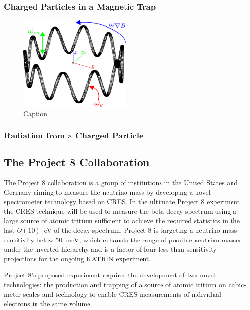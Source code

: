 \subsubsection*{Charged Particles in a Magnetic Trap}

\begin{figure}[htbp]
    \centering
    \includegraphics[width=0.5\textwidth]{figs/Chapter-3/230511_trapped_motion.png}
    \caption{Caption}
    \label{fig:chap3-trapped-electron-motion}
\end{figure}

\subsubsection*{Radiation from a Charged Particle}


\subsection{The Project 8 Collaboration}

The Project 8 collaboration is a group of institutions in the United States and Germany aiming to measure the neutrino mass by developing a novel spectrometer technology based on CRES. In the ultimate Project 8 experiment the CRES technique will be used to measure the beta-decay spectrum using a large source of atomic tritium sufficient to achieve the required statistics in the last $O(10)$~eV of the decay spectrum. Project 8 is targeting a neutrino mass sensitivity below 50~meV, which exhausts the range of possible neutrino masses under the inverted hierarchy and is a factor of four less than sensitivity projections for the ongoing KATRIN experiment.

Project 8's proposed experiment requires the development of two novel technologies: the production and trapping of a source of atomic tritium on cubic-meter scales and technology to enable CRES measurements of individual electrons in the same volume. 


